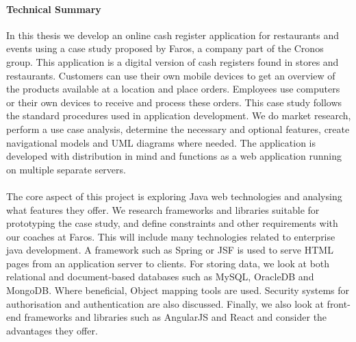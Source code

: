 \documentclass[12pt]{article}
\begin{document}
\paragraph{Technical Summary}
In this thesis we develop an online cash register application for restaurants and events using a case study proposed by Faros, a company part of the Cronos group. This application is a digital version of cash registers found in stores and restaurants. Customers can use their own mobile devices to get an overview of the products available at a location and place orders. Employees use computers or their own devices to receive and process these orders. This case study follows the standard procedures used in application development. We do market research, perform a use case analysis, determine the necessary and optional features, create navigational models and UML diagrams where needed. The application is developed with distribution in mind and functions as a web application running on multiple separate servers.
\\\\
The core aspect of this project is exploring Java web technologies and analysing what features they oﬀer. We research frameworks and libraries suitable for prototyping the case study, and deﬁne constraints and other requirements with our coaches at Faros. This will include many technologies related to enterprise java development. A framework such as Spring or JSF is used to serve HTML pages from an application server to clients. For storing data, we look at both relational and document-based databases such as MySQL, OracleDB and MongoDB. Where beneficial, Object mapping tools are used. Security systems for authorisation and authentication are also discussed. Finally, we also look at front-end frameworks and libraries such as AngularJS and React and consider the advantages they offer.
\\\\
\end{document}
